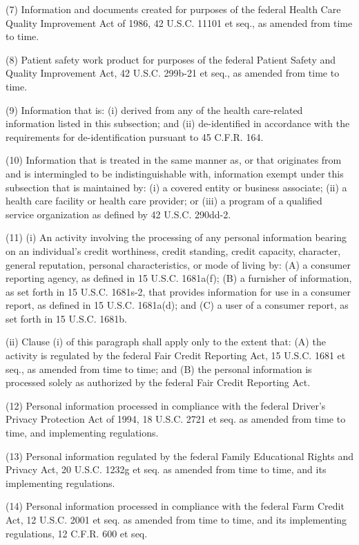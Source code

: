 (7) Information and documents created for purposes of the federal Health Care Quality Improvement Act of 1986, 42 U.S.C. 11101 et seq., as amended from time to time.

(8) Patient safety work product for purposes of the federal Patient Safety and Quality Improvement Act, 42 U.S.C. 299b-21 et seq., as amended from time to time.

(9) Information that is: (i) derived from any of the health care-related information listed in this subsection; and (ii) de-identified in accordance with the requirements for de-identification pursuant to 45 C.F.R. 164.

(10) Information that is treated in the same manner as, or that originates from and is intermingled to be indistinguishable with, information exempt under this subsection that is maintained by: (i) a covered entity or business associate; (ii) a health care facility or health care provider; or (iii) a program of a qualified service organization as defined by 42 U.S.C. 290dd-2.  

(11) (i) An activity involving the processing of any personal information bearing on an individual’s credit worthiness, credit standing, credit capacity, character, general reputation, personal characteristics, or mode of living by: (A) a consumer reporting agency, as defined in 15 U.S.C. 1681a(f); (B) a furnisher of information, as set forth in 15 U.S.C. 1681s-2, that provides information for use in a consumer report, as defined in 15 U.S.C. 1681a(d); and (C) a user of a consumer report, as set forth in 15 U.S.C. 1681b.

(ii) Clause (i) of this paragraph shall apply only to the extent that: (A) the activity is regulated by the federal Fair Credit Reporting Act, 15 U.S.C. 1681 et seq., as amended from time to time; and (B) the personal information is processed solely as authorized by the federal Fair Credit Reporting Act.

(12) Personal information processed in compliance with the federal Driver’s Privacy Protection Act of 1994, 18 U.S.C. 2721 et seq. as amended from time to time, and implementing regulations.

(13) Personal information regulated by the federal Family Educational Rights and Privacy Act, 20 U.S.C. 1232g et seq. as amended from time to time, and its implementing regulations.

(14) Personal information processed in compliance with the federal Farm Credit Act, 12 U.S.C. 2001 et seq. as amended from time to time, and its implementing regulations, 12 C.F.R. 600 et seq.

